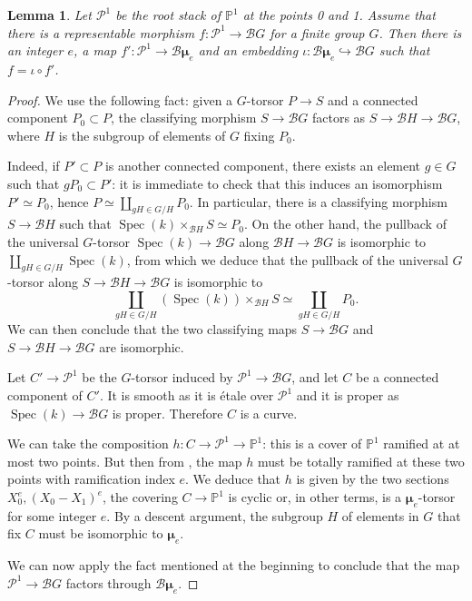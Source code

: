 \documentclass{amsart}
\newcommand{\bP}{\mathbb{P}}
\newcommand{\cB}{\mathcal{B}}
\newcommand{\cP}{\mathcal{P}}
\newcommand{\spec}{\operatorname{Spec}}
\newcommand{\bmu}{\bm{\mu}}
\newtheorem{Lemma}[theorem]{Lemma}
\theoremstyle{definition}
\begin{document}
\begin{Lemma}\label{lemma stabilizers stacky destabilizing p1s}
Let $\cP^1$ be the root stack of $\bP^1$ at the points 0 and 1. Assume that there is a representable morphism $f:\cP^1\to \cB G$ for a finite group $G$. Then there is an integer $e$, a map $f':\cP^1\to \cB\bmu_e$ and an embedding $\iota:\cB\bmu_e\hookrightarrow \cB G$ such that $f=\iota \circ f'$.
\end{Lemma}
\begin{proof}
We use the following fact: given a $G$-torsor $P\to S$ and a connected component $P_0\subset P$, the classifying morphism $S\to \cB G$ factors as $S\to \cB H\to \cB G$, where $H$ is the subgroup of elements of $G$ fixing $P_0$. 

Indeed, if $P'\subset P$ is another connected component, there exists an element $g\in G$ such that $gP_0\subset P'$: it is immediate to check that this induces an isomorphism $P'\simeq P_0$, hence $P\simeq \coprod_{gH \in G/H} P_0$. In particular, there is a classifying morphism $S\to \cB H$ such that $\spec(k)\times_{\cB H} S\simeq P_0$. On the other hand, the pullback of the universal $G$-torsor $\spec(k)\to \cB G$ along $\cB H\to \cB G$ is isomorphic to $\coprod_{gH \in G/H} \spec(k)$, from which we deduce that the pullback of the universal $G$-torsor along $S\to \cB H\to \cB G$ is isomorphic to 
\[ \coprod_{gH\in G/H} (\spec(k))\times_{\cB H} S \simeq \coprod_{gH \in G/H} P_0. \]
We can then conclude that the two classifying maps $S\to \cB G$ and $S\to \cB H\to \cB G$ are isomorphic.

Let $C'\to \cP^1$ be the $G$-torsor induced by $\cP^1\to \cB G$, and let $C$ be a connected component of $C'$. It is smooth as it is \'etale over $\cP^1$ and it is proper as $\spec(k)\to \cB G$ is proper. Therefore $C$ is a curve. 

We can take the composition $h:C\to \cP^1\to \bP^1$: this is a cover of $\bP^1$ ramified at at most two points. But then from , the map $h$ must be totally ramified at these two points with ramification index $e$.
We deduce that $h$ is given by the two sections $X_0^e, (X_0-X_1)^e$, the covering $C\to\bP^1$ is cyclic or, in other terms, is a $\bmu_e$-torsor for some integer $e$. By a descent argument, the subgroup $H$ of elements in $G$ that fix $C$ must be isomorphic to $\bmu_e$.

We can now apply the fact mentioned at the beginning to conclude that the map $\cP^1\to \cB G$ factors through $\cB\bmu_e$.\end{proof}
\end{document}
